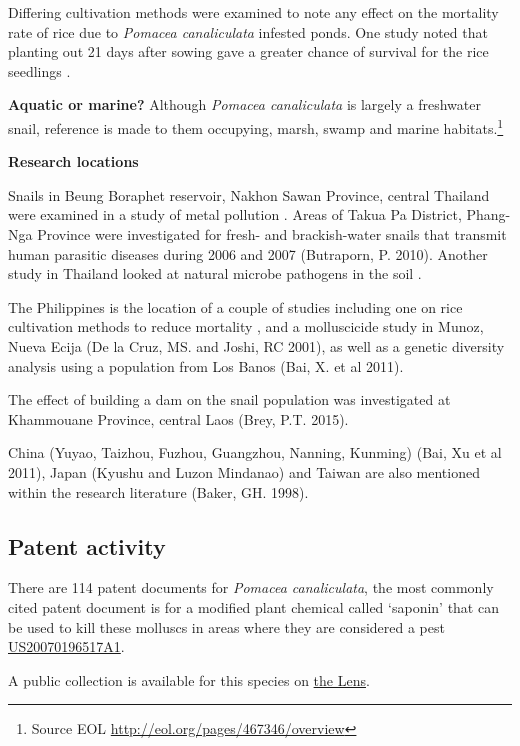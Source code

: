 \documentclass[]{book}
\theoremstyle{definition}
\theoremstyle{definition}
\theoremstyle{definition}
\theoremstyle{remark}
\begin{document}
Differing cultivation methods were examined to note any effect on the
mortality rate of rice due to \emph{Pomacea canaliculata} infested
ponds. One study noted that planting out 21 days after sowing gave a
greater chance of survival for the rice seedlings \citep{Horgan_2014}.

\textbf{Aquatic or marine?} Although \emph{Pomacea canaliculata} is
largely a freshwater snail, reference is made to them occupying, marsh,
swamp and marine habitats.\footnote{Source EOL
  \url{http://eol.org/pages/467346/overview}}

\textbf{Research locations}

Snails in Beung Boraphet reservoir, Nakhon Sawan Province, central
Thailand were examined in a study of metal pollution
\citep{Dummee_2012}. Areas of Takua Pa District, Phang-Nga Province were
investigated for fresh- and brackish-water snails that transmit human
parasitic diseases during 2006 and 2007 (Butraporn, P. 2010). Another
study in Thailand looked at natural microbe pathogens in the soil
\citep{Chobchuenchom_2003}.

The Philippines is the location of a couple of studies including one on
rice cultivation methods to reduce mortality \citep{Horgan_2014}, and a
molluscicide study in Munoz, Nueva Ecija (De la Cruz, MS. and Joshi, RC
2001), as well as a genetic diversity analysis using a population from
Los Banos (Bai, X. et al 2011).

The effect of building a dam on the snail population was investigated at
Khammouane Province, central Laos (Brey, P.T. 2015).

China (Yuyao, Taizhou, Fuzhou, Guangzhou, Nanning, Kunming) (Bai, Xu et
al 2011), Japan (Kyushu and Luzon Mindanao) \citep{Wada_2011} and Taiwan
are also mentioned within the research literature (Baker, GH. 1998).

\hypertarget{patent-activity-7}{%
\subsection{Patent activity}\label{patent-activity-7}}

There are 114 patent documents for \emph{Pomacea canaliculata}, the most
commonly cited patent document is for a modified plant chemical called
`saponin' that can be used to kill these molluscs in areas where they
are considered a pest
\href{https://www.lens.org/lens/patent/US_2007_0196517_A1}{US20070196517A1}.

A public collection is available for this species on
\href{https://www.lens.org/lens/collection/24984}{the Lens}.
\end{document}
